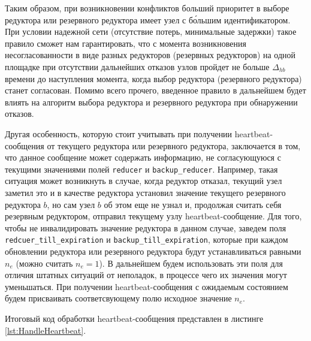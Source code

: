 Таким образом, при возникновении конфликтов больший приоритет в выборе редуктора или резервного редуктора имеет узел с б\'{о}льшим идентификатором. При условии надежной сети (отсутствие потерь, минимальные задержки) такое правило сможет нам гарантировать, что с момента возникновения несогласованности в виде разных редукторов (резервных редукторов) на одной площадке при отсутствии дальнейших отказов узлов пройдет не больше $\Delta_{hb}$ времени до наступления момента, когда выбор редуктора (резервного редуктора) станет согласован. Помимо всего прочего, введенное правило в дальнейшем будет влиять на алгоритм выбора редуктора и резервного редуктора при обнаружении отказов.

Другая особенность, которую стоит учитывать при получении heartbeat-со\-об\-ще\-ния от текущего редуктора или резервного редуктора, заключается в том, что данное сообщение может содержать информацию, не согласующуюся с текущими значениями полей \texttt{reducer} и \texttt{backup\_reducer}. Например, такая ситуация может возникнуть в случае, когда редуктор отказал, текущий узел заметил это и в качестве редуктора установил значение текущего резервного редуктора $b$, но сам узел $b$ об этом еще не узнал и, продолжая считать себя резервным редуктором, отправил текущему узлу heartbeat-со\-об\-ще\-ние. Для того, чтобы не инвалидировать значение редуктора в данном случае, заведем поля \texttt{redcuer\_till\_expiration} и \texttt{backup\_till\_expiration}, которые при каждом обновлении редуктора или резервного редуктора будут устанавливаться равными $n_e$ (можно считать $n_e = 1$). В дальнейшем будем использовать эти поля для отличия штатных ситуаций от неполадок, в процессе чего их значения могут уменьшаться. При получении heartbeat-со\-об\-ще\-ния с ожидаемым состоянием будем присваивать соответсвующему полю исходное значение $n_e$.

Итоговый код обработки heartbeat-со\-об\-ще\-ния представлен в листинге \ref{lst:HandleHeartbeat}.

